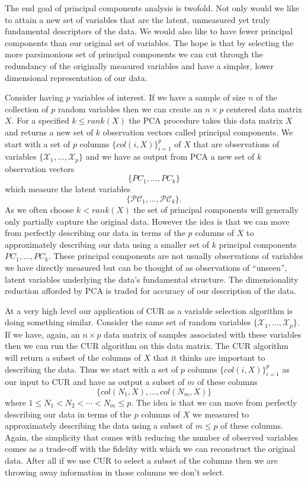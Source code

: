 \documentclass{book}
\begin{document}
The end goal of principal components analysis is twofold. Not only would we like to attain a new set of variables that are the latent, unmeasured yet truly fundamental descriptors of the data. We would also like to have fewer principal components than our original set of variables. The hope is that by selecting the more parsimonious set of principal components we can cut through the redundancy of the originally measured variables and have a simpler, lower dimensional representation of our data.  

Consider having $p$ variables of interest. If we have a sample of size $n$ of the collection of $p$ random variables then we can create an $n \times p$ centered data matrix $X$. For a specified $k \leq rank(X)$ the PCA procedure takes this data matrix $X$ and returns a new set of $k$ observation vectors called principal components. We start with a set of $p$ columns $\{col(i,X)\}_{i=1}^{p}$ of $X$ that are observations of variables $\{\mathscr{X}_1,\ldots,\mathscr{X}_p\}$ and we have as output from PCA a new set of $k$ observation vectors 
$$
\{PC_1,\ldots,PC_k\}
$$
which measure the latent variables
$$
\{\mathscr{PC}_1,\ldots,\mathscr{PC}_k\}.
$$
As we often choose $k<rank(X)$ the set of principal components will generally only partially capture the original data. However the idea is that we can move from perfectly describing our data in terms of the $p$ columns of $X$ to approximately describing our data using a smaller set of $k$ principal components $PC_1,\ldots,PC_k$. These principal components are not usually observations of variables we have directly measured but can be thought of as observations of ``unseen'', latent variables underlying the data's fundamental structure. The dimensionality reduction afforded by PCA is traded for accuracy of our description of the data. 

At a very high level our application of CUR as a variable selection algorithm is doing something similar. Consider the same set of random variables $\{\mathscr{X}_1,\ldots,\mathscr{X}_p\}$. If we have, again, an $n \times p$ data matrix of samples associated with these variables then we can run the CUR algorithm on this data matrix. The CUR algorithm will return a subset of the columns of $X$ that it thinks are important to describing the data. Thus we start with a set of $p$ columns $\{col(i,X)\}_{i=1}^{p}$ as our input to CUR and have as output a subset of $m$ of these columns
$$
\{col(N_1,X),\ldots,col(N_m,X)\}
$$
where $1\leq N_1 < N_2 < \cdots < N_m \leq p$. The idea is that we can move from perfectly describing our data in terms of the $p$ columns of $X$ we measured to approximately describing the data using a subset of $m \leq p$ of these columns. Again, the simplicity that comes with reducing the number of observed variables comes as a trade-off with the fidelity with which we can reconstruct the original data. After all if we use CUR to select a subset of the columns then we are throwing away information in those columns we don't select. 
\end{document}
